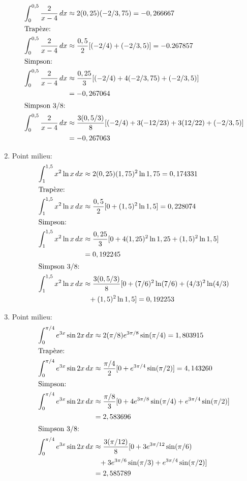 \begin{exercice}
\begin{sol}
\begin{enumerate}
\begin{align*}
        \int_0^{0,5} \frac{2}{x - 4}\, dx &\approx
        2(0,25) (-2/3,75) = -0,266667 \\
        \intertext{Trapèze:}
        \int_0^{0,5} \frac{2}{x - 4}\, dx &\approx
        \frac{0,5}{2} [(-2/4) + (-2/3,5)] = -0.267857 \\
        \intertext{Simpson:}
        \int_0^{0,5} \frac{2}{x - 4}\, dx &\approx
        \frac{0,25}{3} [(-2/4) + 4(-2/3,75) + (-2/3,5)] \\
        &= -0,267064 \\
        \intertext{Simpson 3/8:}
        \int_0^{0,5} \frac{2}{x - 4}\, dx &\approx
        \frac{3(0,5/3)}{8} [(-2/4) + 3(-12/23) + 3(12/22) + (-2/3,5)] \\
        &= -0,267063
      \end{align*}
    \item Point milieu:
      \begin{align*}
        \int_1^{1,5} x^2 \ln x\, dx &\approx
        2(0,25) (1,75)^2 \ln 1,75 = 0,174331 \\
        \intertext{Trapèze:}
        \int_1^{1,5} x^2 \ln x\, dx &\approx
        \frac{0,5}{2} [0 + (1,5)^2 \ln 1,5] = 0,228074 \\
        \intertext{Simpson:}
        \int_1^{1,5} x^2 \ln x\, dx &\approx
        \frac{0,25}{3} [0 + 4 (1,25)^2 \ln 1,25 + (1,5)^2 \ln 1,5] \\
        &= 0,192245 \\
        \intertext{Simpson 3/8:}
        \int_1^{1,5} x^2 \ln x\, dx &\approx
        \frac{3(0,5/3)}{8} [0 + (7/6)^2 \ln (7/6) + (4/3)^2 \ln (4/3) \\
        &\phantom{\approx} + (1,5)^2 \ln 1,5] = 0,192253
      \end{align*}
    \item Point milieu:
      \begin{align*}
        \int_0^{\pi/4} e^{3x} \sin 2x\, dx &\approx
        2(\pi/8) e^{3\pi/8} \sin (\pi/4) = 1,803915 \\
        \intertext{Trapèze:}
        \int_0^{\pi/4} e^{3x} \sin 2x\, dx &\approx
        \frac{\pi/4}{2} [0 + e^{3\pi/4} \sin (\pi/2)] = 4,143260 \\
        \intertext{Simpson:}
        \int_0^{\pi/4} e^{3x} \sin 2x\, dx &\approx
        \frac{\pi/8}{3} [0 + 4 e^{3\pi/8} \sin (\pi/4) + e^{3\pi/4}
        \sin (\pi/2)] \\
        &= 2,583696 \\
        \intertext{Simpson 3/8:}
        \int_0^{\pi/4} e^{3x} \sin 2x\, dx &\approx
        \frac{3(\pi/12)}{8} [0 + 3 e^{3\pi/12} \sin (\pi/6) \\
        &\phantom{\approx} + 3 e^{3\pi/6} \sin (\pi/3) +
        e^{3\pi/4} \sin (\pi/2)] \\
        &= 2,585789
      \end{align*}
    \end{enumerate}
  \end{sol}
\end{exercice}

